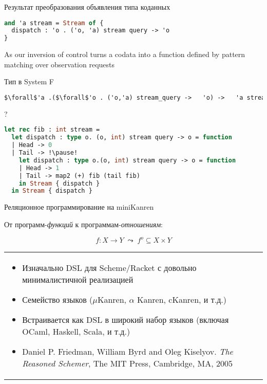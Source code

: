 \documentclass[10pt, mathserif]{beamer}
\newcommand{\oo}[1]{{#1}^o}
\theoremstyle{definition}
\begin{document}
\begin{frame}[fragile]{Результат преобразования объявления типа коданных}
\begin{lstlisting}[language=ocaml]
and 'a stream = Stream of {
  dispatch : 'o . ('o, 'a) stream query -> 'o
}
\end{lstlisting}
As our inversion of control turns a codata into a
function defined by pattern matching over observation requests

\vspace{1cm}

Тип в System F 
\begin{lstlisting}[language=ocaml,mathescape=true]
$\forall$'a .($\forall$'o . ('o,'a) stream_query ->   'o) ->   'a stream
\end{lstlisting}
\end{frame}

\begin{frame}[fragile]{?}
\begin{lstlisting}[language=ocaml]
let rec fib : int stream =
  let dispatch : type o. (o, int) stream query -> o = function
  | Head -> 0
  | Tail -> !\pause!
    let dispatch : type o.(o, int) stream query -> o = function
    | Head -> 1
    | Tail -> map2 (+) fib (tail fib)
    in Stream { dispatch }
  in Stream { dispatch }
\end{lstlisting}
\end{frame}


\begin{frame}{Реляционное программирование на miniKanren}
 \begin{center}
 От программ-\emph{функций} к программам-\emph{отношениям}:
 \end{center}

 $$
 f \colon X \to Y\;\leadsto\;\oo{f} \subseteq X\times Y
 $$
 \vskip5mm
 \begin{tabular}{m{4cm}m{6cm}}
    \begin{itemize}
       \item Изначально DSL для Scheme/Racket с довольно минималистичной реализацией
       \item Семейство языков ($\mu$Kanren, $\alpha$  Kanren, cKanren, и т.д.)
       \item Встраивается как DSL в широкий набор языков (включая OCaml, Haskell, Scala, и т.д.)
       \item Daniel P. Friedman, William Byrd and   Oleg Kiselyov. \emph{The Reasoned Schemer},
       The MIT Press, Cambridge, MA, 2005
    \end{itemize}
 \end{tabular}
 \vskip 3cm
\end{frame}
\end{document}
